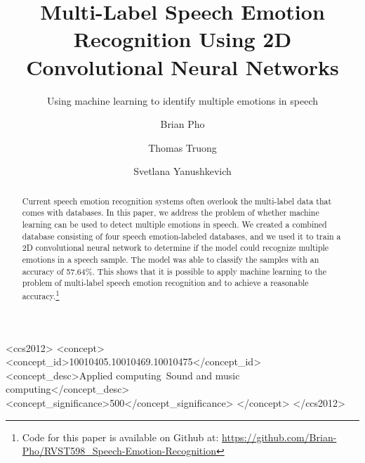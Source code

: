 \documentclass[sigconf]{acmart}
\begin{document}
\title{Multi-Label Speech Emotion Recognition Using 2D Convolutional Neural Networks}
\subtitle{Using machine learning to identify multiple emotions in speech}


\author{Brian Pho}

\author{Thomas Truong}

\author{Svetlana Yanushkevich}

\renewcommand{\shortauthors}{B. Pho et al.}


\begin{abstract}
Current speech emotion recognition systems often overlook the multi-label data that comes with databases. In this paper, we address the problem of whether machine learning can be used to detect multiple emotions in speech. We created a combined database consisting of four speech emotion-labeled databases, and we used it to train a 2D convolutional neural network to determine if the model could recognize multiple emotions in a speech sample. The model was able to classify the samples with an accuracy of 57.64\%. This shows that it is possible to apply machine learning to the problem of multi-label speech emotion recognition and to achieve a reasonable accuracy.\footnote{Code for this paper is available on Github at: \url{https://github.com/Brian-Pho/RVST598_Speech-Emotion-Recognition}}
\end{abstract}

%
%
\begin{CCSXML}
	<ccs2012>
	<concept>
	<concept_id>10010405.10010469.10010475</concept_id>
	<concept_desc>Applied computing~Sound and music computing</concept_desc>
	<concept_significance>500</concept_significance>
	</concept>
	</ccs2012>
\end{CCSXML}





\maketitle




 
\end{document}
